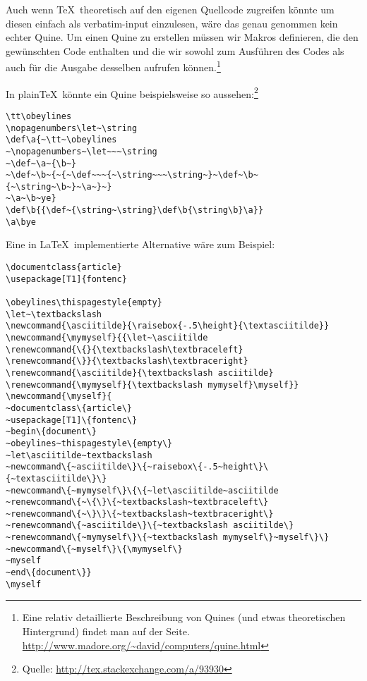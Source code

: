 % 

Auch wenn \TeX\ theoretisch auf den eigenen Quellcode zugreifen könnte um diesen einfach als verbatim-input einzulesen, wäre das genau genommen kein echter Quine.  Um einen Quine zu erstellen müssen wir Makros definieren, die den gewünschten Code enthalten und die wir sowohl zum Ausführen des Codes als auch für die Ausgabe desselben aufrufen können.\footnote{Eine relativ detaillierte Beschreibung von Quines (und etwas theoretischen Hintergrund) findet man auf der Seite. \url{http://www.madore.org/~david/computers/quine.html}}

In plain\TeX\ könnte ein Quine beispielsweise so aussehen:\footnote{Quelle: \url{http://tex.stackexchange.com/a/93930}}

\begin{lstlisting}
\tt\obeylines
\nopagenumbers\let~\string
\def\a{~\tt~\obeylines
~\nopagenumbers~\let~~~\string
~\def~\a~{\b~}
~\def~\b~{~{~\def~~~{~\string~~~\string~}~\def~\b~{~\string~\b~}~\a~}~}
~\a~\b~ye}
\def\b{{\def~{\string~\string}\def\b{\string\b}\a}}
\a\bye
\end{lstlisting}

\pagebreak
\noindent Eine in \LaTeX\ implementierte Alternative wäre zum Beispiel:\footnotemark[\value{footnote}]

\begin{lstlisting}
\documentclass{article}
\usepackage[T1]{fontenc}

\obeylines\thispagestyle{empty}
\let~\textbackslash
\newcommand{\asciitilde}{\raisebox{-.5\height}{\textasciitilde}}
\newcommand{\mymyself}{{\let~\asciitilde
\renewcommand{\{}{\textbackslash\textbraceleft}
\renewcommand{\}}{\textbackslash\textbraceright}
\renewcommand{\asciitilde}{\textbackslash asciitilde}
\renewcommand{\mymyself}{\textbackslash mymyself}\myself}}
\newcommand{\myself}{
~documentclass\{article\}
~usepackage[T1]\{fontenc\}
~begin\{document\}
~obeylines~thispagestyle\{empty\}
~let\asciitilde~textbackslash
~newcommand\{~asciitilde\}\{~raisebox\{-.5~height\}\{~textasciitilde\}\}
~newcommand\{~mymyself\}\{\{~let\asciitilde~asciitilde
~renewcommand\{~\{\}\{~textbackslash~textbraceleft\}
~renewcommand\{~\}\}\{~textbackslash~textbraceright\}
~renewcommand\{~asciitilde\}\{~textbackslash asciitilde\}
~renewcommand\{~mymyself\}\{~textbackslash mymyself\}~myself\}\}
~newcommand\{~myself\}\{\mymyself\}
~myself
~end\{document\}}
\myself

\end{lstlisting}